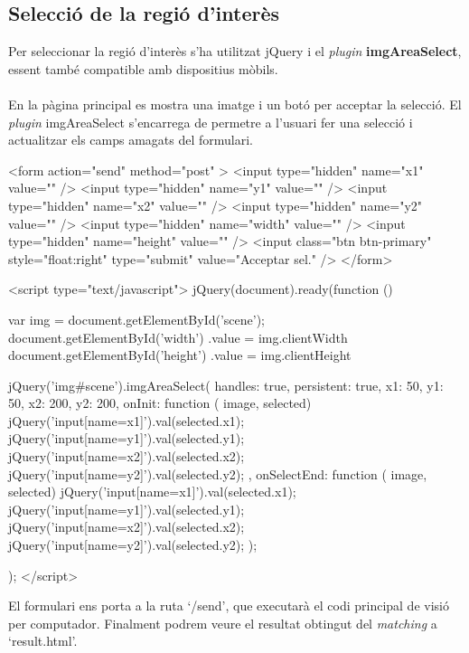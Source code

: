 	\subsection{Selecció de la regió d'interès}
		Per seleccionar la regió d'interès s'ha utilitzat jQuery i el \textit{plugin} \textbf{imgAreaSelect}, essent també compatible amb dispositius mòbils.\\\\
		En la pàgina principal es mostra una imatge i un botó per acceptar la selecció. El \textit{plugin} imgAreaSelect s'encarrega de permetre a l'usuari fer una selecció i actualitzar els camps
		amagats del formulari.\\
		\begin{txt}
<form action="send" method="post" >
	<input type="hidden" name="x1" value="" />
	<input type="hidden" name="y1" value="" />
	<input type="hidden" name="x2" value="" />
	<input type="hidden" name="y2" value="" />
	<input type="hidden" name="width" value="" />
	<input type="hidden" name="height" value="" />
	<input class="btn btn-primary" style="float:right"
		type="submit" value="Acceptar sel." />
</form>

<script type="text/javascript">
	jQuery(document).ready(function () {
		var img = document.getElementById('scene');
		document.getElementById('width')
			.value = img.clientWidth
		document.getElementById('height')
			.value = img.clientHeight

		jQuery('img#scene').imgAreaSelect({
			handles: true,
			persistent: true,
			x1: 50, y1: 50, x2: 200, y2: 200,
			onInit: function ( image, selected) {
				jQuery('input[name=x1]').val(selected.x1);
				jQuery('input[name=y1]').val(selected.y1);
				jQuery('input[name=x2]').val(selected.x2);
				jQuery('input[name=y2]').val(selected.y2);              
			},
			onSelectEnd: function ( image, selected) {
				jQuery('input[name=x1]').val(selected.x1);
				jQuery('input[name=y1]').val(selected.y1);
				jQuery('input[name=x2]').val(selected.x2);
				jQuery('input[name=y2]').val(selected.y2);                           
			}
		});
	});
 </script>
		\end{txt}
\newpage
\noindent
El formulari ens porta a la ruta `/send', que executarà el codi principal de visió per computador. Finalment podrem veure el resultat obtingut del \textit{matching} a `result.html'.\\

